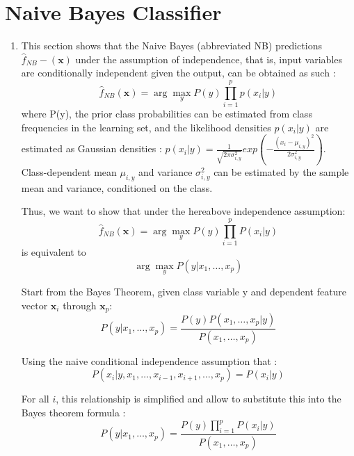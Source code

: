 \documentclass[acmconf,nonacm=true]{acmart}
\begin{document}
\section{Naive Bayes Classifier}

\begin{enumerate}
    \item 
    This section shows that the Naive Bayes (abbreviated NB) predictions $\hat{f}_{NB}-(\mathbf{x})$ under the assumption of independence, that is, input variables are conditionally independent given the output, can be obtained as such : $$\hat{f}_{NB}(\mathbf{x}) = \arg \max_{y}P(y)\prod_{i=1}^{p}p(x_{i}|y)$$ where P(y), the prior class probabilities can be estimated from class frequencies in the learning set, and the likelihood densities $p(x_{i}|y)$ are estimated as Gaussian densities : $p(x_{i}|y) = \frac{1}{\sqrt{2\pi\sigma^{2}_{i,y}}}exp(-\frac{(x_{i}-\mu_{i,y})^{2}}{2\sigma^{2}_{i,y}})$. \\Class-dependent mean $\mu_{i,y}$ and variance $\sigma^{2}_{i,y}$ can be estimated by the sample mean and variance, conditioned on the class.

    Thus, we want to show that under the hereabove independence assumption:
    \begin{equation} \label{eq:1}
    \hat{f}_{NB}(\mathbf{x}) = \arg \max_y P(y) \prod_{i=1}^{p} P(x_i|y)
    \end{equation}
    is equivalent to 
    \begin{equation} \label{eq:2}
    \arg \max_y P(y|x_1, \dots, x_p)
    \end{equation}
    
    Start from the Bayes Theorem, given class variable y and dependent feature vector $\mathbf{x}_{i}$ through $\mathbf{x}_{p}$:
    \begin{equation} \label{eq:3}
    P(y|x_1, \dots, x_p) = \frac{P(y) P(x_1, \dots, x_p|y)}{P(x_1, \dots, x_p)}
    \end{equation}
    
    Using the naive conditional independence assumption that :
    \begin{equation} \label{eq:4}
    P(x_{i}|y, x_1, \dots, x_{i-1}, x_{i+1}, \dots, x_p) = P(x_i|y)
    \end{equation}
    
    For all $i$, this relationship is simplified and allow to substitute this into the Bayes theorem formula :
    \begin{equation} \label{eq:5}
    P(y|x_1, \dots, x_p) = \frac{P(y) \prod_{i=1}^{p} P(x_i|y)}{P(x_1, \dots, x_p)}
    \end{equation}
    

\end{enumerate}
\end{document}
